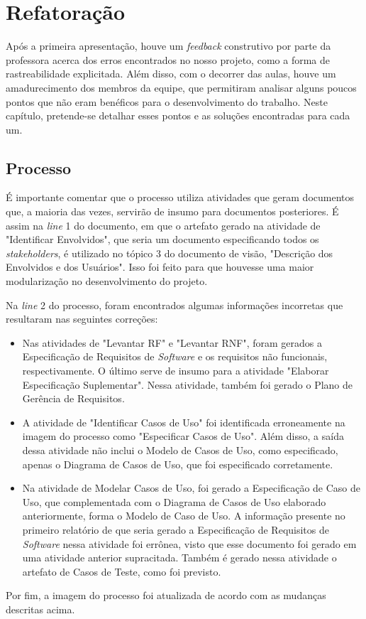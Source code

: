 \chapter{Refatoração}
\label{refactor}

Após a primeira apresentação, houve um \textit{feedback} construtivo por parte da professora acerca dos erros encontrados no nosso projeto, como a forma de rastreabilidade explicitada. Além disso, com o decorrer das aulas, houve um amadurecimento dos membros da equipe, que permitiram analisar alguns poucos pontos que não eram benéficos para o desenvolvimento do trabalho. Neste capítulo, pretende-se detalhar esses pontos e as soluções encontradas para cada um.

\section{Processo}

É importante comentar que o processo utiliza atividades que geram documentos que, a maioria das vezes, servirão de insumo para documentos posteriores. É assim na \textit{line} 1 do documento, em que o artefato gerado na atividade de "Identificar Envolvidos", que seria um documento especificando todos os \textit{stakeholders}, é utilizado no tópico 3 do documento de visão, "Descrição dos Envolvidos e dos Usuários". Isso foi feito para que houvesse uma maior modularização no desenvolvimento do projeto.

Na \textit{line} 2 do processo, foram encontrados algumas informações incorretas que resultaram nas seguintes correções:

\begin{itemize}
\item Nas atividades de "Levantar RF" e "Levantar RNF", foram gerados a Especificação de Requisitos de \textit{Software} e os requisitos não funcionais, respectivamente. O último serve de insumo para a atividade "Elaborar Especificação Suplementar". Nessa atividade, também foi gerado o Plano de Gerência de Requisitos.
\item A atividade de "Identificar Casos de Uso" foi identificada erroneamente na imagem do processo como "Especificar Casos de Uso". Além disso, a saída dessa atividade não inclui o Modelo de Casos de Uso, como especificado, apenas o Diagrama de Casos de Uso, que foi especificado corretamente.
\item Na atividade de Modelar Casos de Uso, foi gerado a Especificação de Caso de Uso, que complementada com o Diagrama de Casos de Uso elaborado anteriormente, forma o Modelo de Caso de Uso. A informação presente no primeiro relatório de que seria gerado a Especificação de Requisitos de \textit{Software} nessa atividade foi errônea, visto que esse documento foi gerado em uma atividade anterior supracitada. Também é gerado nessa atividade o artefato de Casos de Teste, como foi previsto.
\end{itemize}

Por fim, a imagem do processo foi atualizada de acordo com as mudanças descritas acima.
